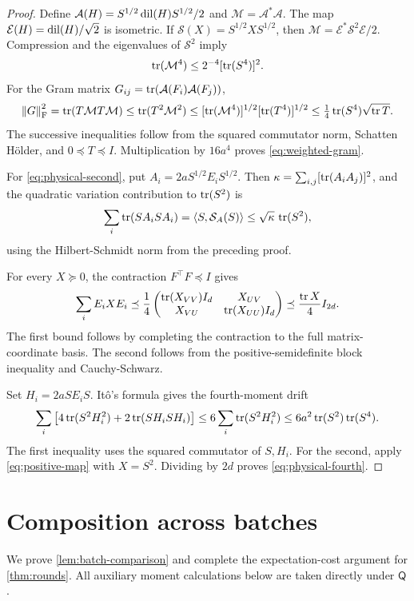 \begin{proof}
Define
$\mathcal A(H)=S^{1/2}\operatorname{dil}(H)S^{1/2}/2$ and
$\mathcal M=\mathcal A^*\mathcal A$.
The map $\mathcal E(H)=\operatorname{dil}(H)/\sqrt2$ is isometric. If
$\mathcal S(X)=S^{1/2}XS^{1/2}$, then
$\mathcal M=\mathcal E^*\mathcal S^2\mathcal E/2$.
Compression and the eigenvalues of $\mathcal S^2$ imply
\[
 \operatorname{tr}(\mathcal M^4)\le2^{-4}[\operatorname{tr}(S^4)]^2.
\]
For the Gram matrix $G_{ij}=\operatorname{tr}(\mathcal A(F_i)\mathcal A(F_j))$,
\[
 \left\lVert G\right\rVert_{\mathrm F}^2
 =\operatorname{tr}(T\mathcal M T\mathcal M)
 \le\operatorname{tr}(T^2\mathcal M^2)
 \le[\operatorname{tr}(\mathcal M^4)]^{1/2}[\operatorname{tr}(T^4)]^{1/2}
 \le\tfrac14\operatorname{tr}(S^4)\sqrt{\operatorname{tr} T}.
\]
The successive inequalities follow from the squared commutator norm, Schatten H\"older, and $0\preceq T\preceq I$.
Multiplication by $16a^4$ proves \cref{eq:weighted-gram}.

For \cref{eq:physical-second}, put
$A_i=2aS^{1/2}E_iS^{1/2}$.
Then $\kappa=\sum_{i,j}[\operatorname{tr}(A_iA_j)]^2$, and the quadratic variation contribution to $\operatorname{tr}(S^2)$ is
\[
 \sum_i\operatorname{tr}(SA_iSA_i)
 =\left\langle S,\mathcal S_A(S)\right\rangle
 \le\sqrt\kappa\,\operatorname{tr}(S^2),
\]
using the Hilbert-Schmidt norm from the preceding proof.

For every $X\succeq0$, the contraction $F^\top F\preceq I$ gives
\begin{equation}
 \sum_iE_iXE_i
 \preceq\frac14
 \begin{pmatrix}
  \operatorname{tr}(X_{VV})I_d&X_{UV}\\
  X_{VU}&\operatorname{tr}(X_{UU})I_d
 \end{pmatrix}
 \preceq\frac{\operatorname{tr} X}{4}I_{2d}.
 \label{eq:positive-map}
\end{equation}
The first bound follows by completing the contraction to the full matrix-coordinate basis. The second follows from the positive-semidefinite block inequality and Cauchy-Schwarz.

Set $H_i=2aSE_iS$. It\^o's formula gives the fourth-moment drift
\[
 \sum_i\left[4\operatorname{tr}(S^2H_i^2)+2\operatorname{tr}(SH_iSH_i)\right]
 \le6\sum_i\operatorname{tr}(S^2H_i^2)
 \le6a^2\operatorname{tr}(S^2)\operatorname{tr}(S^4).
\]
The first inequality uses the squared commutator of $S,H_i$. For the second, apply \cref{eq:positive-map} with $X=S^2$.
Dividing by $2d$ proves \cref{eq:physical-fourth}.
\end{proof}


\section{Composition across batches}
\label{app:rounds}

We prove \cref{lem:batch-comparison} and complete the expectation-cost argument for \cref{thm:rounds}. All auxiliary moment calculations below are taken directly under $\mathsf Q$.

